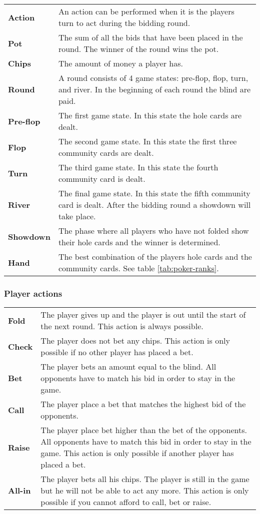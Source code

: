 \begin{tabular}{ p{0.18\linewidth} p{0.82\linewidth} }
\textbf{Action} & An action can be performed when it is the players turn to act during the bidding round.\\
\textbf{Pot} & The sum of all the bids that have been placed in the round. The winner of the round wins the pot.\\
\textbf{Chips} & The amount of money a player has.\\
\textbf{Round} & A round consists of 4 game states: pre-flop, flop, turn, and river. In the beginning of each round the blind are paid.\\
\textbf{Pre-flop} & The first game state. In this state the hole cards are dealt.\\
\textbf{Flop} & The second game state. In this state the first three community cards are dealt.\\
\textbf{Turn} & The third game state. In this state the fourth community card is dealt.\\
\textbf{River} & The final game state. In this state the fifth community card is dealt. After the bidding round a showdown will take place.\\
\textbf{Showdown} & The phase where all players who have not folded show their hole cards and the winner is determined.\\
\textbf{Hand} & The best combination of the players hole cards and the community cards. See table \ref{tab:poker-ranks}.
\end{tabular}

\subsubsection*{Player actions}
\begin{tabular}{ p{0.1\linewidth} p{0.9\linewidth} }
  \textbf{Fold} & The player gives up and the player is out until the start of the next round. This action is always possible.\\
  \textbf{Check} & The player does not bet any chips. This action is only possible if no other player has placed a bet.\\
  \textbf{Bet} & The player bets an amount equal to the blind. All opponents have to match his bid in order to stay in the game.\\
  \textbf{Call} & The player place a bet that matches the highest bid of the opponents.\\
  \textbf{Raise} & The player place bet higher than the bet of the opponents. All opponents have to match this bid in order to stay in the game. This action is only possible if another player has placed a bet.\\
  \textbf{All-in} & The player bets all his chips. The player is still in the game but he will not be able to act any more. This action is only possible if you cannot afford to call, bet or raise.\\
\end{tabular}
